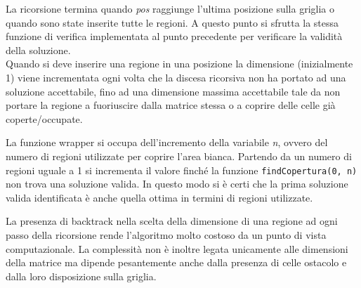 \documentclass[11pt, a4paper, titlepage]{article}
\begin{document}
\begin{enumerate}
            La ricorsione termina quando \emph{pos} raggiunge l'ultima posizione sulla griglia o quando sono state inserite tutte le regioni. A questo punto si sfrutta la stessa funzione
            di verifica implementata al punto precedente per verificare la validità della soluzione.\\

            Quando si deve inserire una regione in una posizione la dimensione (inizialmente 1) viene incrementata ogni volta che la discesa ricorsiva non ha portato ad una soluzione accettabile, fino ad una dimensione
            massima accettabile tale da non portare la regione a fuoriuscire dalla matrice stessa o a coprire delle celle già coperte/occupate.

            La funzione wrapper si occupa dell'incremento della variabile \emph{n}, ovvero del numero di regioni utilizzate per coprire l'area bianca.
            Partendo da un numero di regioni uguale a 1 si incrementa il valore finché la funzione \texttt{findCopertura(0, n)}
            non trova una soluzione valida. In questo modo si è certi che la prima soluzione valida identificata è anche quella ottima in termini di regioni utilizzate.

            La presenza di backtrack nella scelta della dimensione di una regione ad ogni passo della ricorsione rende l'algoritmo molto costoso da un punto di vista
            computazionale. La complessità non è inoltre legata unicamente alle dimensioni della matrice ma dipende pesantemente anche dalla presenza di celle ostacolo
            e dalla loro disposizione sulla griglia. 
        \end{enumerate}
\end{document}
